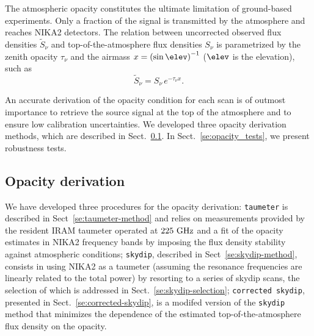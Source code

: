 
The atmospheric opacity constitutes the ultimate limitation of
ground-based experiments. Only a fraction of the
signal is transmitted by the atmosphere and reaches NIKA2 detectors. 
The relation between uncorrected observed flux densities
$\tilde{S}_{\nu}$ and top-of-the-atmosphere flux densities $S_{\nu}$
is parametrized by the zenith opacity $\tau_{\nu}$
and the airmass $x = \left(\sin\elev\right)^{-1}$ ($\elev$ is the elevation), such as
\begin{equation}
\tilde{S}_{\nu} = S_{\nu} \, e^{-\tau_{\nu}  x}.
\label{eq:uncorr_flux}
\end{equation}

An accurate derivation of the opacity condition for each scan is
of outmost importance to retrieve the source signal at the top of the
atmosphere and to ensure low calibration uncertainties.
We developed three opacity derivation methods, which are described in
Sect.~\ref{se:opacity_methods}. In Sect.~\ref{se:opacity_tests}, we
present robustness tests.

\subsection{Opacity derivation}
\label{se:opacity_methods}

We have developed
three procedures for the opacity derivation: {\tt taumeter} is
described in Sect~\ref{se:taumeter-method} and relies on measurements
provided by the resident IRAM taumeter operated at $225~\rm{GHz}$ and
a fit of the opacity estimates in NIKA2 frequency bands by imposing
the flux density stability against atmospheric conditions;
{\tt skydip}, described in Sect~\ref{se:skydip-method}, consists in
using NIKA2 as a taumeter (assuming the resonance frequencies are
linearly related to the total power) by resorting to a series of
skydip scans, the selection of which is addressed in
Sect.~\ref{se:skydip-selection}; {\tt corrected skydip}, presented in
Sect.~\ref{se:corrected-skydip}, is a modifed
version of the {\tt skydip} method that minimizes the dependence of the
estimated top-of-the-atmosphere flux density on the opacity.


